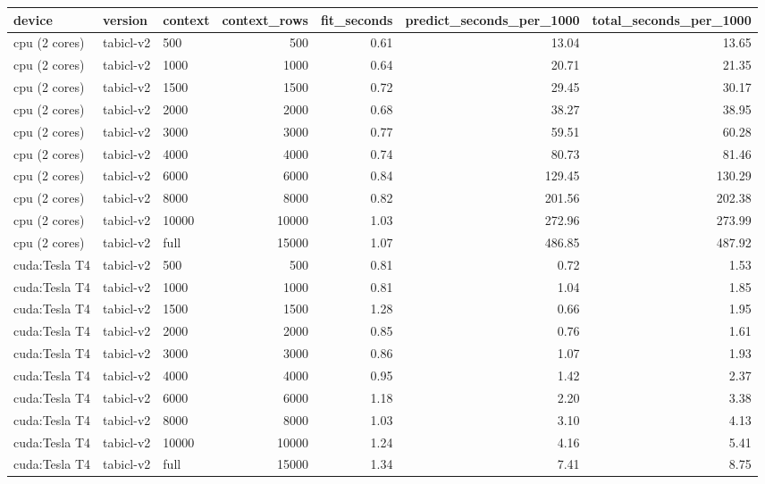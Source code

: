 \begin{tabular}{lllrrrr}
\toprule
device & version & context & context_rows & fit_seconds & predict_seconds_per_1000 & total_seconds_per_1000 \\
\midrule
cpu (2 cores) & tabicl-v2 & 500 & 500 & 0.61 & 13.04 & 13.65 \\
cpu (2 cores) & tabicl-v2 & 1000 & 1000 & 0.64 & 20.71 & 21.35 \\
cpu (2 cores) & tabicl-v2 & 1500 & 1500 & 0.72 & 29.45 & 30.17 \\
cpu (2 cores) & tabicl-v2 & 2000 & 2000 & 0.68 & 38.27 & 38.95 \\
cpu (2 cores) & tabicl-v2 & 3000 & 3000 & 0.77 & 59.51 & 60.28 \\
cpu (2 cores) & tabicl-v2 & 4000 & 4000 & 0.74 & 80.73 & 81.46 \\
cpu (2 cores) & tabicl-v2 & 6000 & 6000 & 0.84 & 129.45 & 130.29 \\
cpu (2 cores) & tabicl-v2 & 8000 & 8000 & 0.82 & 201.56 & 202.38 \\
cpu (2 cores) & tabicl-v2 & 10000 & 10000 & 1.03 & 272.96 & 273.99 \\
cpu (2 cores) & tabicl-v2 & full & 15000 & 1.07 & 486.85 & 487.92 \\
cuda:Tesla T4 & tabicl-v2 & 500 & 500 & 0.81 & 0.72 & 1.53 \\
cuda:Tesla T4 & tabicl-v2 & 1000 & 1000 & 0.81 & 1.04 & 1.85 \\
cuda:Tesla T4 & tabicl-v2 & 1500 & 1500 & 1.28 & 0.66 & 1.95 \\
cuda:Tesla T4 & tabicl-v2 & 2000 & 2000 & 0.85 & 0.76 & 1.61 \\
cuda:Tesla T4 & tabicl-v2 & 3000 & 3000 & 0.86 & 1.07 & 1.93 \\
cuda:Tesla T4 & tabicl-v2 & 4000 & 4000 & 0.95 & 1.42 & 2.37 \\
cuda:Tesla T4 & tabicl-v2 & 6000 & 6000 & 1.18 & 2.20 & 3.38 \\
cuda:Tesla T4 & tabicl-v2 & 8000 & 8000 & 1.03 & 3.10 & 4.13 \\
cuda:Tesla T4 & tabicl-v2 & 10000 & 10000 & 1.24 & 4.16 & 5.41 \\
cuda:Tesla T4 & tabicl-v2 & full & 15000 & 1.34 & 7.41 & 8.75 \\
\bottomrule
\end{tabular}
